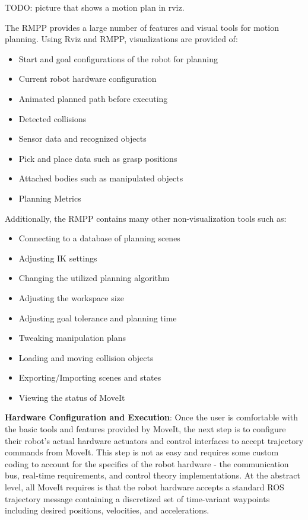 \documentclass[10pt,journal,compsoc]{joser1}
\begin{document}
{TODO: picture that shows a motion plan in rviz.

The RMPP provides a large number of features and visual tools for motion planning. Using Rviz and RMPP, visualizations are provided of:
\begin{itemize}
    \item Start and goal configurations of the robot for planning
    \item Current robot hardware configuration
    \item Animated planned path before executing
    \item Detected collisions
    \item Sensor data and recognized objects
    \item Pick and place data such as grasp positions
    \item Attached bodies such as manipulated objects
    \item Planning Metrics
\end{itemize}

Additionally, the RMPP contains many other non-visualization tools such as:
\begin{itemize}
    \item Connecting to a database of planning scenes
    \item Adjusting IK settings
    \item Changing the utilized planning algorithm
    \item Adjusting the workspace size
    \item Adjusting goal tolerance and planning time
    \item Tweaking manipulation plans
    \item Loading and moving collision objects
    \item Exporting/Importing scenes and states
    \item Viewing the status of MoveIt
\end{itemize}

{\bf Hardware Configuration and Execution}: Once the user is comfortable with the basic tools and features provided by MoveIt, the next step is to configure their robot's actual hardware actuators and control interfaces to accept trajectory commands from MoveIt. This step is not as easy and requires some custom coding to account for the specifics of the robot hardware - the communication bus, real-time requirements, and control theory implementations. At the abstract level, all MoveIt requires is that the robot hardware accepts a standard ROS trajectory message containing a discretized set of time-variant waypoints including desired positions, velocities, and accelerations.  

}
\end{document}
